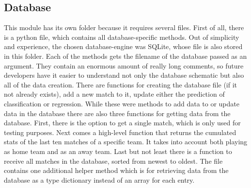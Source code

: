 \subsection{Database}
This module has its own folder because it requires several files. First of all, there is a python file, which contains all database-specific methods. Out of simplicity and experience, the chosen database-engine was SQLite, whose file is also stored in this folder. Each of the methods gets the filename of the database passed as an argument. They contain an enormous amount of really long comments, so future developers have it easier to understand not only the database schematic but also all of the data creation. There are functions for creating the database file (if it not already exists), add a new match to it, update either the prediction of classification or regression. While these were methods to add data to or update data in the database there are also three functions for getting data from the database. First, there is the option to get a single match, which is only used for testing purposes. Next comes a high-level function that returns the cumulated stats of the last ten matches of a specific team. It takes into account both playing as home team and as an away team. Last but not least there is a function to receive all matches in the database, sorted from newest to oldest. The file contains one additional helper method which is for retrieving data from the database as a type dictionary instead of an array for each entry.

